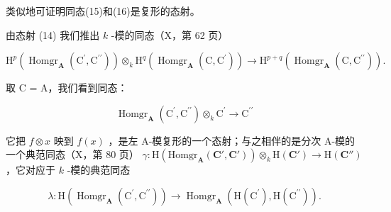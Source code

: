 类似地可证明同态(15)和(16)是复形的态射。

由态射 (14) 我们推出 \(k\) -模的同态（X，第 62 页）

\[
\mathrm{H} ^ {p} \left(\operatorname{Homgr} _ {\mathbf {A}} \left(\mathrm{C} ^ {\prime}, \mathrm{C} ^ {\prime \prime}\right)\right) \otimes_ {k} \mathrm{H} ^ {q} \left(\operatorname{Homgr} _ {\mathbf {A}} \left(\mathrm{C}, \mathrm{C} ^ {\prime}\right)\right)\rightarrow \mathrm{H} ^ {p + q} \left(\operatorname{Homgr} _ {\mathbf {A}} \left(\mathrm{C}, \mathrm{C} ^ {\prime \prime}\right)\right). \tag {17}
\]

取 C = A，我们看到同态：

\[
\operatorname{Homgr} _ {\mathbf {A}} \left(\mathrm{C} ^ {\prime}, \mathrm{C} ^ {\prime \prime}\right) \otimes_ {k} \mathrm{C} ^ {\prime} \rightarrow \mathrm{C} ^ {\prime \prime}\tag{18}
\]

它把 \(f \otimes x\) 映到 \(f(x)\) ，是左 A-模复形的一个态射；与之相伴的是分次 A-模的一个典范同态（X，第 80 页） \(\gamma : \mathrm{H}(\mathrm{Homgr}_{\mathbf{A}}(\mathbf{C}', \mathbf{C}')) \otimes_k \mathrm{H}(\mathbf{C}') \to \mathrm{H}(\mathbf{C}'')\) ，它对应于 \(k\) -模的典范同态

\[
\lambda : \mathrm{H} (\operatorname{Homgr} _ {\mathbf {A}} \left(\mathrm{C} ^ {\prime}, \mathrm{C} ^ {\prime \prime}\right)) \rightarrow \operatorname{Homgr} _ {\mathbf {A}} \left(\mathrm{H} (\mathrm{C} ^ {\prime}), \mathrm{H} (\mathrm{C} ^ {\prime \prime})\right).
\]

